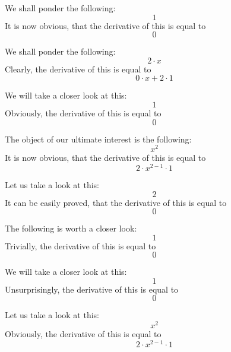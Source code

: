 \documentclass{article}
\begin{document}
We shall ponder the following:
\begin{equation}
1 
\end{equation}
It is now obvious, that the derivative of this is equal to
\begin{equation}
0 
\end{equation}

We shall ponder the following:
\begin{equation}
2 \cdot x 
\end{equation}
Clearly, the derivative of this is equal to
\begin{equation}
0 \cdot x + 2 \cdot 1 
\end{equation}

We will take a closer look at this:
\begin{equation}
1 
\end{equation}
Obviously, the derivative of this is equal to
\begin{equation}
0 
\end{equation}

The object of our ultimate interest is the following:
\begin{equation}
x ^{2 } 
\end{equation}
It is now obvious, that the derivative of this is equal to
\begin{equation}
2 \cdot x ^{2 - 1 } \cdot 1 
\end{equation}

Let us take a look at this:
\begin{equation}
2 
\end{equation}
It can be easily proved, that the derivative of this is equal to
\begin{equation}
0 
\end{equation}

The following is worth a closer look:
\begin{equation}
1 
\end{equation}
Trivially, the derivative of this is equal to
\begin{equation}
0 
\end{equation}

We will take a closer look at this:
\begin{equation}
1 
\end{equation}
Unsurprisingly, the derivative of this is equal to
\begin{equation}
0 
\end{equation}

Let us take a look at this:
\begin{equation}
x ^{2 } 
\end{equation}
Obviously, the derivative of this is equal to
\begin{equation}
2 \cdot x ^{2 - 1 } \cdot 1 
\end{equation}
\end{document}
